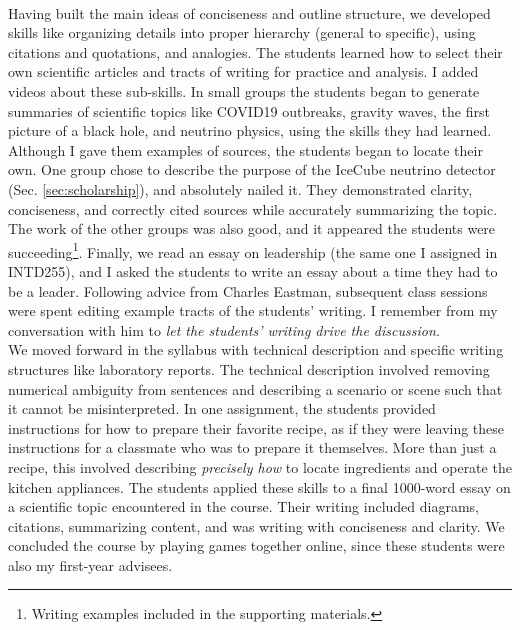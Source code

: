 \documentclass[../../../main.tex]{subfiles}
\begin{document}
\\
\vspace{0.25cm}
Having built the main ideas of conciseness and outline structure, we developed skills like organizing details into proper hierarchy (general to specific), using citations and quotations, and analogies.  The students learned how to select their own scientific articles and tracts of writing for practice and analysis.  I added videos about these sub-skills.  In small groups the students began to generate summaries of scientific topics like COVID19 outbreaks, gravity waves, the first picture of a black hole, and neutrino physics, using the skills they had learned.  Although I gave them examples of sources, the students began to locate their own.  One group chose to describe the purpose of the IceCube neutrino detector (Sec. \ref{sec:scholarship}), and absolutely nailed it.  They demonstrated clarity, conciseness, and correctly cited sources while accurately summarizing the topic.  The work of the other groups was also good, and it appeared the students were succeeding\footnote{Writing examples included in the supporting materials.}.  Finally, we read an essay on leadership (the same one I assigned in INTD255), and I asked the students to write an essay about a time they had to be a leader.  Following advice from Charles Eastman, subsequent class sessions were spent editing example tracts of the students' writing.  I remember from my conversation with him to \textit{let the students' writing drive the discussion.}
\\
\vspace{0.25cm}
We moved forward in the syllabus with technical description and specific writing structures like laboratory reports.  The technical description involved removing numerical ambiguity from sentences and describing a scenario or scene such that it cannot be misinterpreted.  In one assignment, the students provided instructions for how to prepare their favorite recipe, as if they were leaving these instructions for a classmate who was to prepare it themselves.  More than just a recipe, this involved describing \textit{precisely how} to locate ingredients and operate the kitchen appliances.  The students applied these skills to a final 1000-word essay on a scientific topic encountered in the course.  Their writing included diagrams, citations, summarizing content, and was writing with conciseness and clarity.  We concluded the course by playing games together online, since these students were also my first-year advisees.
\end{document}
